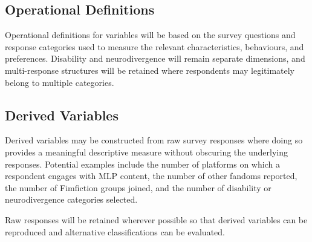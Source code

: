 
\subsection{Operational Definitions}

Operational definitions for variables will be based on the survey questions and response categories used to measure the relevant characteristics, behaviours, and preferences. Disability and neurodivergence will remain separate dimensions, and multi-response structures will be retained where respondents may legitimately belong to multiple categories.


\subsection{Derived Variables}

Derived variables may be constructed from raw survey responses where doing so provides a meaningful descriptive measure without obscuring the underlying responses. Potential examples include the number of platforms on which a respondent engages with MLP content, the number of other fandoms reported, the number of Fimfiction groups joined, and the number of disability or neurodivergence categories selected.

Raw responses will be retained wherever possible so that derived variables can be reproduced and alternative classifications can be evaluated.


